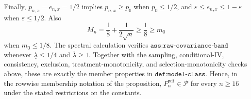 Finally, \(p_{n,x}=e_{n,x}=1/2\) implies \(p_{n,x}\geq p_0\) when \(p_0\leq1/2\), and \(\varepsilon\leq e_{n,x}\leq1-\varepsilon\) when \(\varepsilon\leq1/2\). Also
\[
M_n=\frac18+\frac1{2\sqrt n}\geq\frac18\geq m_0
\]
when \(m_0\leq1/8\). The spectral calculation verifies \(\texttt{ass:raw-covariance-band}\) whenever \(\underline\lambda\leq1/4\) and \(\overline\lambda\geq1\). Together with the sampling, conditional-IV, consistency, exclusion, treatment-monotonicity, and selection-monotonicity checks above, these are exactly the member properties in \(\texttt{def:model-class}\). Hence, in the rowwise membership notation of the proposition, \(P_n^{\mathrm{wit}}\in\mathcal P\) for every \(n\geq16\) under the stated restrictions on the constants.

